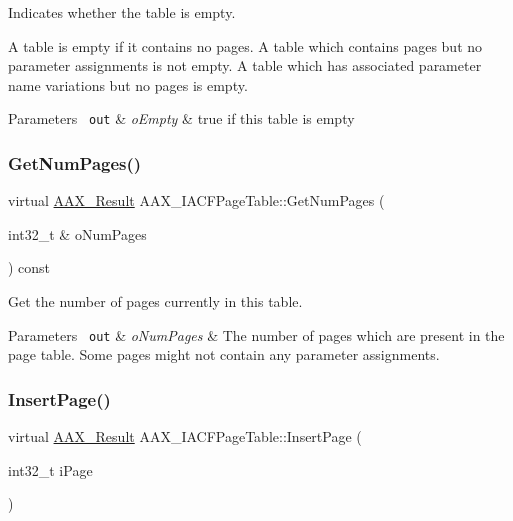 Indicates whether the table is empty. 

A table is empty if it contains no pages. A table which contains pages but no parameter assignments is not empty. A table which has associated parameter name variations but no pages is empty.


\begin{DoxyParams}[1]{Parameters}
\mbox{\texttt{ out}}  & {\em o\+Empty} & {\ttfamily true} if this table is empty \\
\hline
\end{DoxyParams}
\mbox{\label{a01725_a8c86b0cfe2d9cfe8b745c09ccf2d8619}} 
\subsubsection{\texorpdfstring{GetNumPages()}{GetNumPages()}}
{\footnotesize\ttfamily virtual \mbox{\hyperlink{a00392_a4d8f69a697df7f70c3a8e9b8ee130d2f}{A\+A\+X\+\_\+\+Result}} A\+A\+X\+\_\+\+I\+A\+C\+F\+Page\+Table\+::\+Get\+Num\+Pages (\begin{DoxyParamCaption}\item[{int32\+\_\+t \&}]{o\+Num\+Pages }\end{DoxyParamCaption}) const\hspace{0.3cm}{\ttfamily [pure virtual]}}



Get the number of pages currently in this table. 


\begin{DoxyParams}[1]{Parameters}
\mbox{\texttt{ out}}  & {\em o\+Num\+Pages} & The number of pages which are present in the page table. Some pages might not contain any parameter assignments. \\
\hline
\end{DoxyParams}
\mbox{\label{a01725_aed3706e4e59c9cf58603db7d06888c81}} 
\subsubsection{\texorpdfstring{InsertPage()}{InsertPage()}}
{\footnotesize\ttfamily virtual \mbox{\hyperlink{a00392_a4d8f69a697df7f70c3a8e9b8ee130d2f}{A\+A\+X\+\_\+\+Result}} A\+A\+X\+\_\+\+I\+A\+C\+F\+Page\+Table\+::\+Insert\+Page (\begin{DoxyParamCaption}\item[{int32\+\_\+t}]{i\+Page }\end{DoxyParamCaption})\hspace{0.3cm}{\ttfamily [pure virtual]}}



